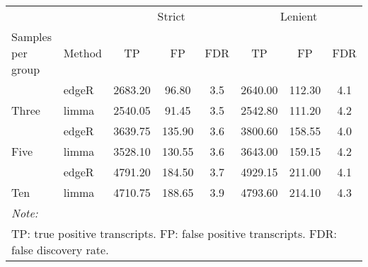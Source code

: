 
\begin{tabular}[t]{llcccccc}
\toprule
\multicolumn{2}{c}{ } & \multicolumn{3}{c}{Strict} & \multicolumn{3}{c}{Lenient} \\
\cmidrule(l{3pt}r{3pt}){3-5} \cmidrule(l{3pt}r{3pt}){6-8}
\makecell[l]{Samples per\\group} & Method & TP & FP & FDR & TP & FP & FDR\\
\midrule
 & edgeR & 2683.20 & 96.80 & 3.5 & 2640.00 & 112.30 & 4.1\\

\multirow{-2}{*}{\raggedright\arraybackslash Three} & limma & 2540.05 & 91.45 & 3.5 & 2542.80 & 111.20 & 4.2\\
\cmidrule{1-8}
 & edgeR & 3639.75 & 135.90 & 3.6 & 3800.60 & 158.55 & 4.0\\

\multirow{-2}{*}{\raggedright\arraybackslash Five} & limma & 3528.10 & 130.55 & 3.6 & 3643.00 & 159.15 & 4.2\\
\cmidrule{1-8}
 & edgeR & 4791.20 & 184.50 & 3.7 & 4929.15 & 211.00 & 4.1\\

\multirow{-2}{*}{\raggedright\arraybackslash Ten} & limma & 4710.75 & 188.65 & 3.9 & 4793.60 & 214.10 & 4.3\\
\bottomrule
\multicolumn{8}{l}{\rule{0pt}{1em}\textit{Note: }}\\
\multicolumn{8}{l}{\rule{0pt}{1em}TP: true positive transcripts. FP: false positive transcripts. FDR: false discovery rate.}\\
\end{tabular}
